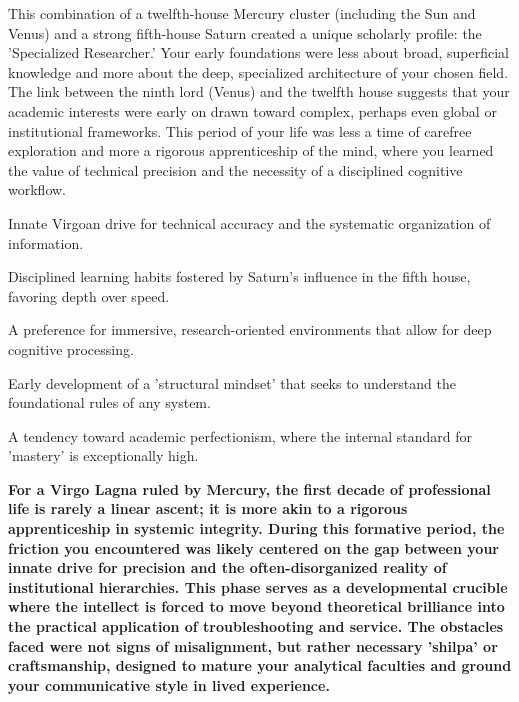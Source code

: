 {\fontsize{9}{13}\selectfont This combination of a twelfth-house Mercury cluster (including the Sun and Venus) and a strong fifth-house Saturn created a unique scholarly profile: the 'Specialized Researcher.' Your early foundations were less about broad, superficial knowledge and more about the deep, specialized architecture of your chosen field. The link between the ninth lord (Venus) and the twelfth house suggests that your academic interests were early on drawn toward complex, perhaps even global or institutional frameworks. This period of your life was less a time of carefree exploration and more a rigorous apprenticeship of the mind, where you learned the value of technical precision and the necessity of a disciplined cognitive workflow.}\par\vspace{1.8mm}

\begin{diamondlist}
  \item {\fontsize{8.5}{12}\selectfont Innate Virgoan drive for technical accuracy and the systematic organization of information.}
  \item {\fontsize{8.5}{12}\selectfont Disciplined learning habits fostered by Saturn's influence in the fifth house, favoring depth over speed.}
  \item {\fontsize{8.5}{12}\selectfont A preference for immersive, research-oriented environments that allow for deep cognitive processing.}
  \item {\fontsize{8.5}{12}\selectfont Early development of a 'structural mindset' that seeks to understand the foundational rules of any system.}
  \item {\fontsize{8.5}{12}\selectfont A tendency toward academic perfectionism, where the internal standard for 'mastery' is exceptionally high.}
\end{diamondlist}


\label{topic38}

{\fontsize{9.5}{13.8}\selectfont\bfseries\color{DeepSlate} For a Virgo Lagna ruled by Mercury, the first decade of professional life is rarely a linear ascent; it is more akin to a rigorous apprenticeship in systemic integrity. During this formative period, the friction you encountered was likely centered on the gap between your innate drive for precision and the often-disorganized reality of institutional hierarchies. This phase serves as a developmental crucible where the intellect is forced to move beyond theoretical brilliance into the practical application of troubleshooting and service. The obstacles faced were not signs of misalignment, but rather necessary 'shilpa' or craftsmanship, designed to mature your analytical faculties and ground your communicative style in lived experience.}\par\vspace{2mm}

